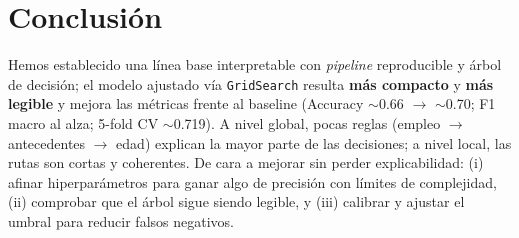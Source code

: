 \section{Conclusión}

Hemos establecido una línea base interpretable con \emph{pipeline} reproducible y árbol de decisión; el modelo ajustado vía \texttt{GridSearch} resulta \textbf{más compacto} y \textbf{más legible} y mejora las métricas frente al baseline (Accuracy $\sim$0.66 $\rightarrow$ $\sim$0.70; F1 macro al alza; 5-fold CV $\sim$0.719). A nivel global, pocas reglas (empleo $\rightarrow$ antecedentes $\rightarrow$ edad) explican la mayor parte de las decisiones; a nivel local, las rutas son cortas y coherentes. De cara a mejorar sin perder explicabilidad: (i) afinar hiperparámetros para ganar algo de precisión con límites de complejidad, (ii) comprobar que el árbol sigue siendo legible, y (iii) calibrar y ajustar el umbral para reducir falsos negativos.

